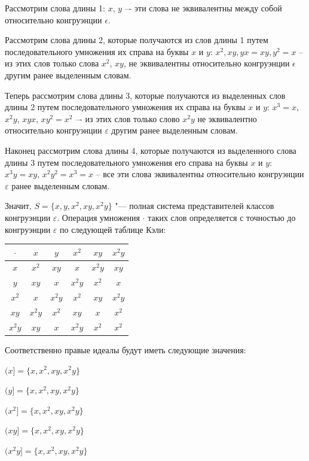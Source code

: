 \documentclass[bachelor, och, labwork]{shiza}
\begin{document}
    Рассмотрим слова длины 1: $x$, $y$ –- эти слова не эквивалентны между собой относительно конгруэнции $\epsilon$.

    Рассмотрим слова длины 2, которые получаются из слов
    длины 1 путем последовательного умножения их справа на буквы $x$ и $y$: $x^2, xy, yx = xy, y^2 = x$ -- из этих 
    слов только слова $x^2$, $xy$, не эквивалентны относительно конгруэнции $\epsilon$ другим ранее выделенным словам.

    Теперь рассмотрим слова длины 3, которые получаются из выделенных слов длины 2 путем последовательного
    умножения их справа на буквы $x$ и $y$: $x^3 = x$, $x^2y$, $xyx$,  $xy^2 = x^2$  –- из этих слов только
    слово $x^2y$ не эквивалентно относительно конгруэнции $\varepsilon$ другим ранее выделенным словам.

    Наконец рассмотрим слова длины 4, которые получаются из выделенного слова длины 3 путем последовательного
    умножения его справа на буквы $x$ и $y$: $x^3y = xy$, $x^2y^2 = x^3 = x$ -- все эти слова эквивалентны
    относительно конгруэнции $\varepsilon$ ранее выделенным словам.

        Значит, $S = \{x, y, x^2, xy, x^2y \}$ "--- полная система представителей классов конгруэнции $\varepsilon$.
        Операция умножения $\cdot$ таких слов определяется с точностью до конгруэнции $\varepsilon$ по следующей таблице
        Кэли:

     \begin{table}[H]
          \centering
          \begin{tabular}{|c|c|c|c|c|c|}
          \hline
          $\cdot $ & $x$ & $y$  & $x^2$  & $xy$ & $x^2y$ \\ \hline
          $x$      & $x^2$ & $xy$ & $x$  & $x^2y$ & $xy$ \\ \hline
          $y$      & $xy$ & $x$ & $x^2y$ & $x^2$ & $x$ \\ \hline
          $x^2$     & $x$ & $x^2y$ & $x^2$ & $xy$ & $x^2y$ \\ \hline
          $xy$    & $x^2y$ & $x^2$ & $xy$ & $x$ & $x^2$ \\ \hline
          $x^2y$   & $xy$ &  $x$  &  $x^2y$ & $x^2$ & $x^2$ \\ \hline
          \end{tabular}
        \end{table}

      Соответственно правые идеалы будут иметь следующие значения:

      \begin{center}

        $(x] = \{x, x^2, xy, x^2y\}$

        $(y] = \{x, x^2, xy, x^2y\}$
  
        $(x^2] = \{x, x^2, xy, x^2y\}$
  
        $(xy] = \{x, x^2, xy, x^2y\}$
    
        $(x^2y] = \{x, x^2, xy, x^2y\}$

      \end{center}
\end{document}
